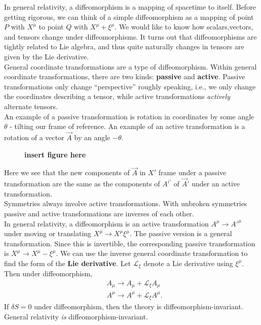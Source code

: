 \documentclass{book}
\numberwithin{equation}{section}
\theoremstyle{definition}
\newcommand{\lag}{\mathcal{L}}
\begin{document}
In general relativity, a diffeomorphism is a mapping of spacetime to itself. Before getting rigorous, we can think of a simple diffeomorphism as a mapping of point $P$ with $X^\mu$ to point $Q$ with $X^\mu+ \xi^\mu$. We would like to know how scalars,vectors, and tensors change under diffeomorphisms. It turns out that diffeomorphisms are tightly related to Lie algebra, and thus quite naturally changes in tensors are given by the Lie derivative. \\

General coordinate transformations are a type of diffeomorphism. Within general coordinate transformations, there are two kinds: \textbf{passive} and \textbf{active}. Passive transformations only change ``perspective'' roughly speaking, i.e., we only change the coordinates describing a tensor, while active transformations \textit{actively} alternate tensors. \\

An example of a passive transformation is rotation in coordinates by some angle $\theta$ - tilting our frame of reference. An example of an active transformation is a rotation of a vector $\vec{A}$ by an angle $-\theta$.

\begin{figure}[h!]
	\textbf{insert figure here}
\end{figure}


Here we see that the new components of $\vec{A}$ in $X'$ frame under a passive transformation are the same as the components of $A^{i'}$ of $\vec{A}'$ under an active transformation. \\

Symmetries always involve active transformations. With unbroken symmetries passive and active transformations are inverses of each other. \\

In general relativity, a diffeomorphism is an active transformation $A^\mu \to A'^\mu$ under moving or translating $X^\mu \to X^\mu \xi^\mu$. The passive version is a general transformation. Since this is invertible, the corresponding passive transformation is $X^\mu \to X^\mu -\xi^\mu$. We can use the inverse general coordinate transformation to find the form of the \textbf{Lie derivative}. Let $\lag_\xi$ denote a Lie derivative using $\xi^\mu$. Then under diffeomorphism,
\begin{align*}
&A_\mu \to A_\mu + \lag_\xi A_\mu\\
&A^\mu \to A^\mu + \lag_\xi A^\mu.
\end{align*}
If $\delta S = 0$ under diffeomorphism, then the theory is diffeomorphism-invariant. General relativity \textit{is} diffeomorphism-invariant. \\
\end{document}

